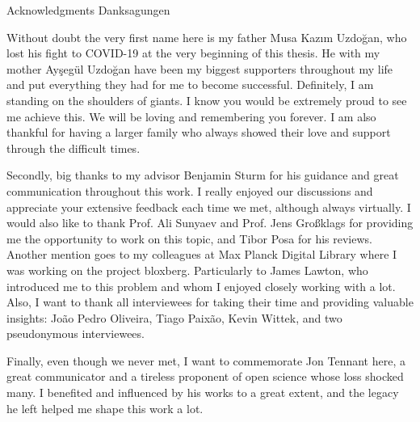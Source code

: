 \makeatletter
{}
{}
{}
\makeatother
\thispagestyle{empty}

\vspace*{20mm}

\begin{center}
\makeatletter
{}
{ Acknowledgments}
{ Danksagungen}
\makeatother
\end{center}

\vspace{10mm}

Without doubt the very first name here is my father Musa Kazım Uzdoğan, who lost his fight to COVID-19 at the very beginning of this thesis. He with my mother Ayşegül Uzdoğan have been my biggest supporters throughout my life and put everything they had for me to become successful. Definitely, I am standing on the shoulders of giants. I know you would be extremely proud to see me achieve this. We will be loving and remembering you forever. I am also thankful for having a larger family who always showed their love and support through the difficult times.

Secondly, big thanks to my advisor Benjamin Sturm for his guidance and great communication throughout this work. I really enjoyed our discussions and appreciate your extensive feedback each time we met, although always virtually. I would also like to thank Prof. Ali Sunyaev and Prof. Jens Großklags for providing me the opportunity to work on this topic, and Tibor Posa for his reviews. Another mention goes to my colleagues at Max Planck Digital Library where I was working on the project bloxberg. Particularly to James Lawton, who introduced me to this problem and whom I enjoyed closely working with a lot. Also, I want to thank all interviewees for taking their time and providing valuable insights: João Pedro Oliveira, Tiago Paixão, Kevin Wittek, and two pseudonymous interviewees.

Finally, even though we never met, I want to commemorate Jon Tennant here, a great communicator and a tireless proponent of open science whose loss shocked many. I benefited and influenced by his works to a great extent, and the legacy he left helped me shape this work a lot. 

\cleardoublepage{}
